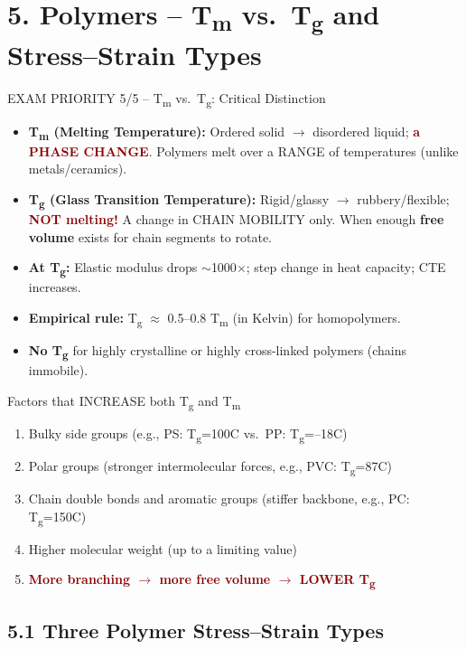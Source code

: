 \documentclass[11pt,a4paper]{article}
\newcommand{\mysec}[1]{\section*{#1}}
\newcommand{\mysubsec}[1]{\subsection*{#1}}
\newcommand{\CRIT}[1]{\textcolor{DarkRed}{\textbf{#1}}}
\newcommand{\HI}[1]{\colorbox{yellow!20}{\textcolor{DarkPurple}{\textbf{#1}}}}
\begin{document}
\newpage
\mysec{5. Polymers -- T\textsubscript{m} vs.\ T\textsubscript{g} and Stress--Strain Types}

\begin{critbox}{EXAM PRIORITY 5/5 -- T\textsubscript{m} vs.\ T\textsubscript{g}: Critical Distinction}
\begin{itemize}[leftmargin=*,nosep]
    \item \HI{T\textsubscript{m} (Melting Temperature):} Ordered solid $\to$ disordered liquid; \CRIT{a PHASE CHANGE}. Polymers melt over a RANGE of temperatures (unlike metals/ceramics).
    \item \HI{T\textsubscript{g} (Glass Transition Temperature):} Rigid/glassy $\to$ rubbery/flexible; \CRIT{NOT melting!} A change in CHAIN MOBILITY only. When enough \textbf{free volume} exists for chain segments to rotate.
    \item \textbf{At T\textsubscript{g}:} Elastic modulus drops $\sim$1000$\times$; step change in heat capacity; CTE increases.
    \item \HI{Empirical rule:} T\textsubscript{g} $\approx$ 0.5--0.8 T\textsubscript{m} (in Kelvin) for homopolymers.
    \item \textbf{No T\textsubscript{g}} for highly crystalline or highly cross-linked polymers (chains immobile).
\end{itemize}
\end{critbox}

\begin{impbox}{Factors that INCREASE both T\textsubscript{g} and T\textsubscript{m}}
\begin{enumerate}[leftmargin=*,nosep]
    \item Bulky side groups (e.g., PS: T\textsubscript{g}=100\textdegree C vs.\ PP: T\textsubscript{g}=--18\textdegree C)
    \item Polar groups (stronger intermolecular forces, e.g., PVC: T\textsubscript{g}=87\textdegree C)
    \item Chain double bonds and aromatic groups (stiffer backbone, e.g., PC: T\textsubscript{g}=150\textdegree C)
    \item Higher molecular weight (up to a limiting value)
    \item \CRIT{More branching $\to$ more free volume $\to$ LOWER T\textsubscript{g}}
\end{enumerate}
\end{impbox}

\mysubsec{5.1 Three Polymer Stress--Strain Types}
\end{document}
